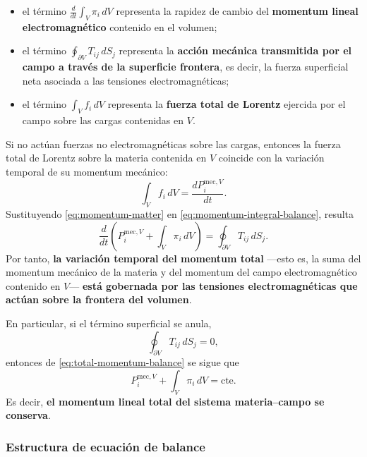\documentclass[12pt,a4paper]{article}
\theoremstyle{definition}
\theoremstyle{plain}
\numberwithin{equation}{section}
\theoremstyle{remark}
\begin{document}
\begin{itemize}
    \item el término $\displaystyle \frac{d}{dt}\int_V\pi_i\,dV$ representa la rapidez de cambio del \textbf{momentum lineal electromagnético} contenido en el volumen;
    \item el término $\displaystyle \oint_{\partial V}T_{ij}\,dS_j$ representa la \textbf{acción mecánica transmitida por el campo a través de la superficie frontera}, es decir, la fuerza superficial neta asociada a las tensiones electromagnéticas;
    \item el término $\displaystyle \int_V f_i\,dV$ representa la \textbf{fuerza total de Lorentz} ejercida por el campo sobre las cargas contenidas en $V$.
\end{itemize}

Si no actúan fuerzas no electromagnéticas sobre las cargas, entonces la fuerza total de Lorentz sobre la materia contenida en $V$ coincide con la variación temporal de su momentum mecánico:
\begin{equation}
    \int_V f_i\,dV
    =
    \frac{dP_i^{\mathrm{mec},V}}{dt}.
    \label{eq:momentum-matter}
\end{equation}
Sustituyendo \eqref{eq:momentum-matter} en \eqref{eq:momentum-integral-balance}, resulta
\begin{equation}
    \frac{d}{dt}
    \left(
        P_i^{\mathrm{mec},V}
        +
        \int_V \pi_i\,dV
    \right)
    =
    \oint_{\partial V}T_{ij}\,dS_j.
    \label{eq:total-momentum-balance}
\end{equation}
Por tanto, \textbf{la variación temporal del momentum total} ---esto es, la suma del momentum mecánico de la materia y del momentum del campo electromagnético contenido en $V$--- \textbf{está gobernada por las tensiones electromagnéticas que actúan sobre la frontera del volumen}.

En particular, si el término superficial se anula,
\begin{equation}
    \oint_{\partial V}T_{ij}\,dS_j=0,
    \label{eq:zero-surface-stress}
\end{equation}
entonces de \eqref{eq:total-momentum-balance} se sigue que
\begin{equation}
    P_i^{\mathrm{mec},V}
    +
    \int_V \pi_i\,dV
    =
    \mathrm{cte}.
    \label{eq:momentum-conservation-total}
\end{equation}
Es decir, \textbf{el momentum lineal total del sistema materia--campo se conserva}.

\subsubsection*{Estructura de ecuación de balance}
\end{document}
